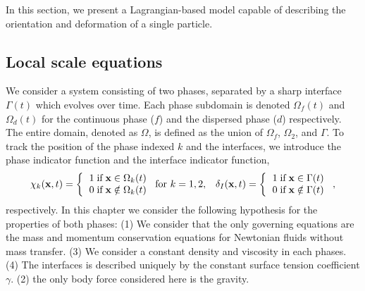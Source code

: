 
In this section, we present a Lagrangian-based model capable of describing the orientation and deformation of a single particle. 
\label{sec:local_eq_ellipse}

\subsection{Local scale equations}

We consider a system consisting of two phases, separated by a sharp interface $\Gamma(t)$ which evolves over time. 
Each phase subdomain is denoted $\Omega_f(t)$ and $\Omega_d(t)$ for the continuous phase ($f$) and the dispersed phase ($d$) respectively. 
The entire domain, denoted as $\Omega$, is defined as the union of $\Omega_f$, $\Omega_2$, and $\Gamma$.
To track the position of the phase indexed $k$ and the interfaces, we introduce the phase indicator function and the interface indicator function, 
\begin{align}
    \chi_k(\textbf{x},t) =  \left\{
      \begin{tabular}{cc}
        $1 \;\text{if} \;\textbf{x} \in \Omega_k(t)$\\
        $0 \;\text{if} \;\textbf{x} \notin \Omega_k(t)$
      \end{tabular}
      \right.
      \text{for $k = 1,2$},
    && \delta_I(\textbf{x},t) =  \left\{
      \begin{tabular}{cc}
        $1 \;\text{if} \;\textbf{x} \in \Gamma(t)$\\
        $0 \;\text{if} \;\textbf{x} \notin \Gamma(t)$
      \end{tabular}
      \right.,
\end{align}
respectively. 
In this chapter we consider the following hypothesis for the properties of both phases:  
(1) We consider that the only governing equations are the mass and momentum conservation equations for Newtonian fluids without mass transfer. 
(3) We consider a constant density and viscosity in each phases. 
(4) The interfaces is described uniquely by the constant surface tension coefficient $\gamma$.
(2) the only body force considered here is the gravity. 

